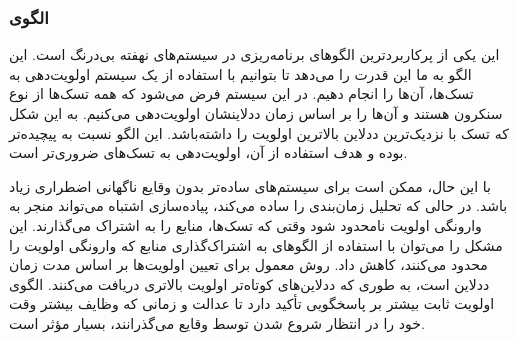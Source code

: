 \subsubsection{الگوی }
\label{scheduleStaticPriSec}
\begin{RTL}
این \cite{ref1} یکی از پرکاربردترین الگوهای برنامه‌ریزی در سیستم‌های نهفته بی‌درنگ
است. این الگو به ما این قدرت را می‌دهد تا بتوانیم با استفاده از
یک سیستم اولویت‌دهی به تسک‌ها، آن‌ها را انجام دهیم. در این
سیستم فرض می‌شود که همه تسک‌ها از نوع سنکرون هستند و
آن‌ها را بر اساس زمان ددلاینشان اولویت‌دهی می‌کنیم. به این شکل که
تسک با نزدیک‌ترین ددلاین بالاترین اولویت را داشته‌باشد. این الگو نسبت
به  پیچیده‌تر بوده
و هدف استفاده از آن، اولویت‌دهی به تسک‌های ضروری‌تر است.
\end{RTL}
\begin{RTL}
با این حال، ممکن است برای سیستم‌های ساده‌تر بدون وقایع ناگهانی
اضطراری زیاد باشد. در حالی که تحلیل زمان‌بندی را ساده می‌کند،
پیاده‌سازی اشتباه می‌تواند منجر به وارونگی اولویت نامحدود شود
وقتی که تسک‌ها، منابع را به اشتراک می‌گذارند. این مشکل را می‌توان
با استفاده از الگوهای به اشتراک‌گذاری منابع که وارونگی اولویت را محدود می‌کنند،
کاهش داد. روش معمول برای تعیین اولویت‌ها بر اساس مدت زمان ددلاین است،
به طوری که ددلاین‌های کوتاه‌تر اولویت بالاتری دریافت می‌کنند.
الگوی اولویت ثابت بیشتر بر پاسخگویی تأکید دارد تا عدالت و
زمانی که وظایف بیشتر وقت خود را در انتظار شروع شدن توسط
وقایع می‌گذرانند، بسیار مؤثر است.
\end{RTL}
